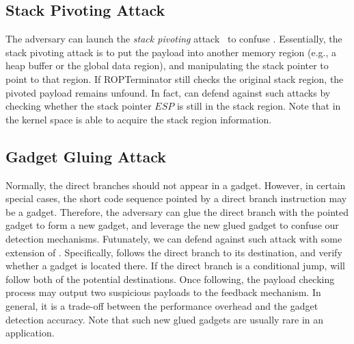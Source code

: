 \subsection{Stack Pivoting Attack}
The adversary can launch the \emph{stack pivoting} attack~\cite{jit-code-reuse} to confuse \name.
Essentially, the stack pivoting attack is to put the payload into another memory region (e.g., a heap buffer or the global data region),
and manipulating the stack pointer to point to that region. If ROPTerminator still checks the original stack region, the pivoted payload
remains unfound. In fact, \name can defend against such attacks by checking whether the stack pointer $ESP$ is still in the stack region. Note that \name in the kernel space is able to acquire the stack region information.

\subsection{Gadget Gluing Attack}
Normally, the direct branches should not appear in a gadget. However, in certain special cases, the short code sequence pointed by a direct branch instruction may be a gadget. Therefore, the adversary can glue the direct branch with the pointed
gadget to form a new gadget, and leverage the new glued gadget to confuse our detection mechanisms. Futunately, we can defend against such attack with some extension of \name. Specifically, \name follows the direct branch to its destination, and verify whether a gadget is located there. If the direct branch
is  a conditional jump, \name will follow both of the potential destinations. Once following, the payload checking process may output two suspicious payloads to the feedback mechanism.
In general, it is a trade-off between the performance overhead and the gadget detection accuracy.
Note that such new glued gadgets are usually rare in an application.

